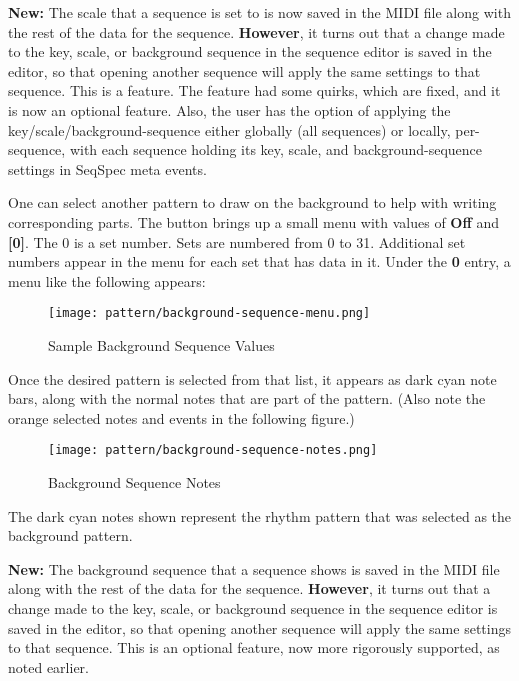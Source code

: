    \textbf{New:}
   The scale that a sequence is set to is
   now saved in the MIDI file along with the rest of the data for the sequence.
   \textbf{However},
   it turns out that a change made to the key, scale, or background sequence in
   the sequence editor is saved in the editor, so that opening another sequence
   will apply the same settings to that sequence.  This is a feature.
   The feature had some quirks, which are fixed, and it is now
   an optional feature.
   Also, the user has the option of applying the key/scale/background-sequence
   either globally (all sequences) or locally, per-sequence, with each sequence
   holding its key, scale, and background-sequence settings in
   SeqSpec meta events.

   One can select another pattern to draw on the background to help with
   writing corresponding parts.
   The button brings up a small menu with values of \textbf{Off} and
   \textbf{[0]}.  The 0 is a set number. Sets are numbered from 0 to 31.
   Additional set numbers appear in the menu for each set that has data in it.
   Under the \textbf{0}
   entry, a menu like the following appears:

\begin{figure}[H]
   \centering 
   \texttt{[image: pattern/background-sequence-menu.png]}
   \caption{Sample Background Sequence Values}
   \label{fig:pattern_editor_background_sequence_menu}
\end{figure}

   Once the desired pattern is selected from that list, it appears as dark cyan
   note bars, along with the normal notes that are part of the pattern.  (Also
   note the orange selected notes and events in the following figure.)

\begin{figure}[H]
   \centering 
   \texttt{[image: pattern/background-sequence-notes.png]}
   \caption{Background Sequence Notes}
   \label{fig:pattern_editor_background_sequence_notes}
\end{figure}

   The dark cyan notes shown represent the rhythm pattern that was selected as
   the background pattern.

   \textbf{New:}
   The background sequence that a sequence shows is saved in the MIDI file
   along with the rest of the data for the sequence.
   \textbf{However},
   it turns out that a change made to the key, scale, or background sequence in
   the sequence editor is saved in the editor, so that opening another sequence
   will apply the same settings to that sequence.  This is an optional feature,
   now more rigorously supported, as noted earlier.

